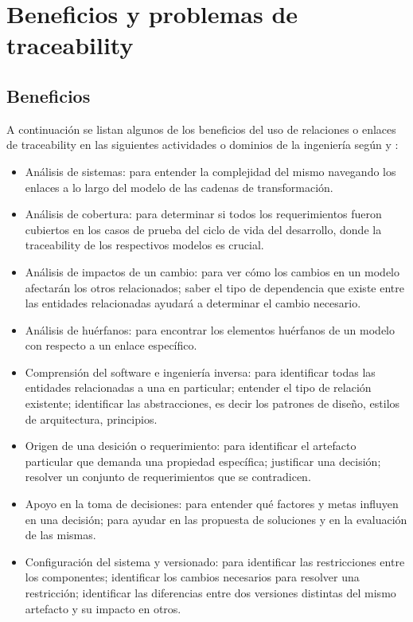 \documentclass[a4paper,12pt,oneside]{book}
\begin{document}
\section{Beneficios y problemas de traceability}

\subsection{Beneficios}

A continuación se listan algunos de los beneficios del uso de relaciones o enlaces de traceability en las siguientes actividades o dominios de la ingeniería según \cite{BrcinaRiebisch} y \cite{GrammelVoigt}:
\begin{itemize}
\item Análisis de sistemas: para entender la complejidad del mismo navegando los enlaces a lo largo del modelo de las cadenas de transformación.   

\item    Análisis de cobertura: para determinar si todos los requerimientos fueron cubiertos en los casos de prueba del ciclo de vida del desarrollo, donde la traceability de los respectivos modelos es crucial.

 \item   Análisis de impactos de un cambio: para ver cómo los cambios en un modelo afectarán los otros relacionados; saber el tipo de dependencia que existe entre las entidades relacionadas ayudará a determinar el cambio necesario.

 \item   Análisis de huérfanos: para encontrar los elementos huérfanos de un modelo con respecto a un enlace específico.

 \item   Comprensión del software e ingeniería inversa: para identificar todas las entidades relacionadas a una en particular; entender el tipo de relación existente; identificar las abstracciones, es decir los patrones de diseño, estilos de arquitectura, principios.

 \item   Origen de una desición o requerimiento: para identificar el artefacto particular que demanda una propiedad específica; justificar una decisión; resolver un conjunto de requerimientos que se contradicen.

 \item   Apoyo en la toma de decisiones: para entender qué factores y metas influyen en una decisión; para ayudar en las propuesta de soluciones y en la evaluación de las mismas.

\item    Configuración del sistema y versionado: para identificar las restricciones entre los componentes; identificar los cambios necesarios para resolver una restricción; identificar las diferencias entre dos versiones distintas del mismo artefacto y su impacto en otros.
\end{itemize}
\end{document}
